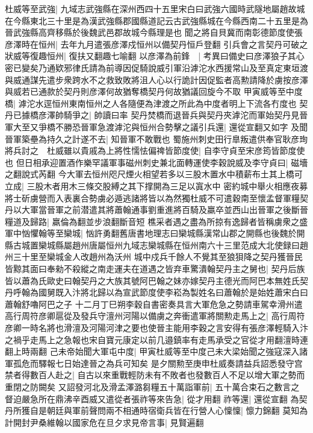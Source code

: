 杜威等至武強|{
	九域志武強縣在深州西四十五里宋白曰武強六國時武隧地屬趙故城在今縣東北三十里是為漢武強縣郡國縣道記云古武強縣城在今縣西南二十五里是為晉武強縣高齊移縣於後魏武邑郡故城今縣理是也}
聞之將自貝冀而南彰德節度使張彦澤時在恒州|{
	去年九月遣張彦澤戍恒州以備契丹恒戶登翻}
引兵會之言契丹可破之狀威等復趣恒州|{
	復扶又翻趣七喻翻}
以彦澤為前鋒　|{
	考異曰備史曰彦澤狼子其心密已變矣乃通欵邪律氏請為前導因促騎說威引軍沿滹沱水西援常山及至真定東垣渡與威通謀先遣步衆跨水不之救致敗將沮人心以行詭計因促監者高勲請降於虜按彦澤與威若已通款於契丹則彦澤何故猶奪橋契丹何故猶議回旋今不取}
甲寅威等至中度橋|{
	滹沱水逕恒州東南恒州之人各隨便為津渡之所此為中度者明上下流各冇度也}
契丹已據橋彦澤帥騎爭之|{
	帥讀曰率}
契丹焚橋而退晉兵與契丹夾滹沱而軍始契丹見晉軍大至又爭橋不勝恐晉軍急渡滹沱與恒州合勢擊之議引兵還|{
	還從宣翻又如字}
及聞晉軍築壘為持久之計遂不去|{
	知晉軍不敢戰也}
蜀施州刺史田行臯叛遣供奉官耿彦珣將兵討之　杜威雖以貴戚為上將性懦怯偏禆皆節度使|{
	自李守貞至宋彦筠皆節度使也}
但日相承迎置酒作樂罕議軍事磁州刺史兼北面轉運使李穀說威及李守貞曰|{
	磁墻之翻說式芮翻}
今大軍去恒州咫尺煙火相望若多以三股木置水中積薪布土其上橋可立成|{
	三股木者用木三條交股縛之其下撑開為三足以寘水中}
密約城中舉火相應夜募將士斫虜營而入表裏合勢虜必遁逃諸將皆以為然獨杜威不可遣穀南至懷孟督軍糧契丹以大軍當晉軍之前潜遣其將蕭翰通事劉重進將百騎及羸卒並西山出晉軍之後斷晉糧道及歸路|{
	羸倫為翻並步浪翻斷音短}
樵采者遇之盡為所掠有逸歸者皆稱虜衆之盛軍中忷懼翰等至欒城|{
	忷許勇翻舊唐書地理志曰欒城縣漢常山郡之開縣也後魏於開縣古城置欒城縣屬趙州唐屬恒州九域志欒城縣在恒州南六十三里范成大北使録曰趙州三十里至欒城金人改趙州為沃州}
城中戍兵千餘人不覺其至狼狽降之契丹獲晉民皆黥其面曰奉勑不殺縱之南走運夫在道遇之皆弃車驚潰翰契丹主之舅也|{
	契丹后族皆以蕭為氏歐史曰翰契丹之大族其號阿巴翰之妹亦嫁契丹主德光而阿巴本無姓氏契丹呼翰為國舅既入汴將北歸以為宣武節度使李崧為製姓名曰蕭翰於是始姓蕭宋白曰蕭翰舒嚕阿巴之子}
十二月丁巳朔李穀自書密奏具言大軍危急之勢請車駕幸滑州遣高行周符彦卿扈從及發兵守澶州河陽以備虜之奔衝遣軍將關勲走馬上之|{
	高行周符彦卿一時名將也滑澶及河陽河津之要也使晉主能用李穀之言安得有張彦澤輕騎入汴之禍乎走馬上之急報也宋自寶元康定以前几邉鎮率有走馬承受之官從才用翻澶時連翻上時兩翻}
己未帝始聞大軍屯中度|{
	甲寅杜威等至中度己未大梁始聞之強寇深入諸軍孤危而驛報七日始達晉之為兵可知矣}
是夕關勲至庚申杜威奏請益兵詔悉發守宫禁者得數百人赴之|{
	自古以來重戰輕防未有不敗者也發數百人不足以增大軍之勢而重閉之防闕矣}
又詔發河北及滑孟澤潞芻糧五十萬詣軍前|{
	五十萬合束石之數言之}
督迫嚴急所在鼎沸辛酉威又遣從者張祚等來告急|{
	從才用翻}
祚等還|{
	還從宣翻}
為契丹所獲自是朝廷與軍前聲問兩不相通時宿衛兵皆在行營人心懍懍|{
	懔力錦翻}
莫知為計開封尹桑維翰以國家危在旦夕求見帝言事|{
	見賢遍翻}
